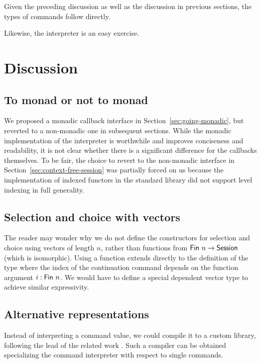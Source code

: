 \documentclass[acmsmall,review,anonymous,screen]{acmart}
\begin{document}
Given the preceding discussion as well as the discussion in previous
sections, the types of commands follow directly.

\multiCmd

Likewise, the interpreter {\Aexec} is an easy exercise.

\multiExec


\section{Discussion}
\label{sec:discussion}

\subsection{To monad or not to monad}
\label{sec:monad-or-not}

We proposed a monadic callback interface in Section~\ref{sec:going-monadic},
but reverted to a non-monadic one in subsequent sections. While the
monadic implementation of the interpreter is worthwhile and improves
conciseness and readability, it is not clear whether there is a
significant difference for the callbacks themselves.
To be fair, the choice to revert to the non-monadic interface in
Section~\ref{sec:context-free-session} was partially forced on us because the implementation of indexed functors in
the standard library did not support level indexing in full generality.

\subsection{Selection and choice with vectors}
\label{sec:select-choice-with}

The reader may wonder why we do not define the constructors for
selection and choice using vectors of length $n$, rather than
functions from $\AFin~n \to \ASession$ (which is isomorphic). Using a function extends
directly to the definition of the {\ACommand} type where the {\ASession} index of the
continuation command depends on the function argument $i : \AFin~n$.
We would have to define a special dependent vector type to achieve similar
expressivity. 

\subsection{Alternative representations}
\label{sec:code-generation}

Instead of interpreting a command value, we could compile it to a
custom library, following the lead of the related work
\cite{DBLP:journals/pacmpl/00020HNY20,DBLP:conf/cc/Miu0Y021}.
Such a compiler can be obtained specializing the command interpreter
with respect to single commands.
\end{document}
